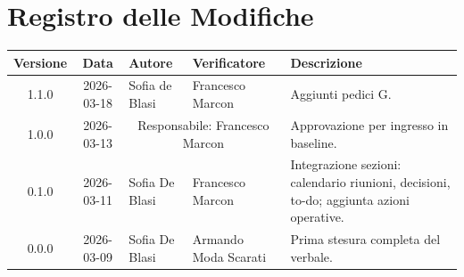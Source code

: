 \section*{Registro delle Modifiche}
\begin{table}[ht]
	\centering
	\renewcommand{\arraystretch}{1.5}
	\begin{tabularx}{\textwidth}{c c l l X}
		\toprule
		\textbf{Versione} & \textbf{Data} & \textbf{Autore} & \textbf{Verificatore} & \textbf{Descrizione} \\
		\midrule
        1.1.0 & 2026-03-18 & Sofia de Blasi & Francesco Marcon & Aggiunti pedici G. \\
        1.0.0 & 2026-03-13 & \multicolumn{2}{c}{Responsabile: Francesco Marcon} & Approvazione per ingresso in baseline. \\
		0.1.0 & 2026-03-11 & Sofia De Blasi & Francesco Marcon & Integrazione sezioni: calendario riunioni, decisioni, to-do; aggiunta azioni operative. \\
		0.0.0 & 2026-03-09 & Sofia De Blasi & Armando Moda Scarati & Prima stesura completa del verbale. \\
		\bottomrule
	\end{tabularx}
\end{table}